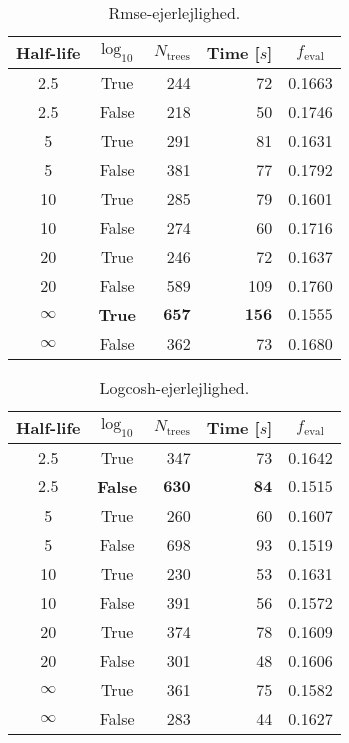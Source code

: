 

 \begin{table}[h!]
  \begin{tabular}{@{}ccrrc@{}}
    Half-life & $\log_{10}$ & $N_\mathrm{trees}$ & Time [$s$] & $f_\mathrm{eval}$ \\
    \midrule
    \num{2.5} & True & \num{244} & \num{72} & \num{0.1663} \\
    \num{2.5} & False & \num{218} & \num{50} & \num{0.1746} \\
    \num{5} & True & \num{291} & \num{81} & \num{0.1631} \\
    \num{5} & False & \num{381} & \num{77} & \num{0.1792} \\
    \num{10} & True & \num{285} & \num{79} & \num{0.1601} \\
    \num{10} & False & \num{274} & \num{60} & \num{0.1716} \\
    \num{20} & True & \num{246} & \num{72} & \num{0.1637} \\
    \num{20} & False & \num{589} & \num{109} & \num{0.1760} \\
    $\bm{\infty}$ & \textbf{True} & $\mathbf{657}$ & $\mathbf{156}$ & $\mathbf{0.1555}$ \\
    $\infty$ & False & \num{362} & \num{73} & \num{0.1680} \\
  \end{tabular}
  \caption{\label{tab:h:HPO_initial_Rmse-ejerlejlighed}Rmse-ejerlejlighed.}
\end{table}


\begin{table}[h!]
  \begin{tabular}{@{}ccrrc@{}}
    Half-life & $\log_{10}$ & $N_\mathrm{trees}$ & Time [$s$] & $f_\mathrm{eval}$ \\
    \midrule
    \num{2.5} & True & \num{347} & \num{73} & \num{0.1642} \\
    $\mathbf{2.5}$ & \textbf{False} & $\mathbf{630}$ & $\mathbf{84}$ & $\mathbf{0.1515}$ \\
    \num{5} & True & \num{260} & \num{60} & \num{0.1607} \\
    \num{5} & False & \num{698} & \num{93} & \num{0.1519} \\
    \num{10} & True & \num{230} & \num{53} & \num{0.1631} \\
    \num{10} & False & \num{391} & \num{56} & \num{0.1572} \\
    \num{20} & True & \num{374} & \num{78} & \num{0.1609} \\
    \num{20} & False & \num{301} & \num{48} & \num{0.1606} \\
    $\infty$ & True & \num{361} & \num{75} & \num{0.1582} \\
    $\infty$ & False & \num{283} & \num{44} & \num{0.1627} \\
  \end{tabular}
  \caption{\label{tab:h:HPO_initial_Logcosh-ejerlejlighed}Logcosh-ejerlejlighed.}
\end{table}

